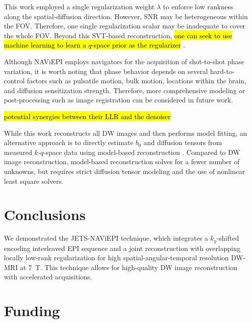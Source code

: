 \documentclass[preprint,12pt,authoryear,review]{elsarticle}
\begin{document}
    This work employed a single regularization weight $\lambda$
    to enforce low rankness along the spatial-diffusion direction.
    However, SNR may be heterogeneous within the FOV.
    Therefore, one single regularization scalar may be inadequate
    to cover the whole FOV.
    Beyond this SVT-based reconstruction,
    \hl{one can seek to use machine learning to
    learn a $q$-space prior as the regularizer}
    \citep{hammernik_2018_varnet,lam_2019_mrsi,mani_2021_qmodel}.

    Although NAViEPI employs navigators for
    the acquisition of shot-to-shot phase variation,
    it is worth noting that phase behavior depends on
    several hard-to-control factors
    such as pulsatile motion, bulk motion,
    locations within the brain, and
    diffusion sensitization strength.
    Therefore, more comprehensive modeling or post-processing
    such as image registration can be considered in future work.

    \hl{potential synergies between their LLR and the denoiser}

    While this work reconstructs all DW images and
    then performs model fitting,
    an alternative approach is to directly estimate
    $b_0$ and diffusion tensors
    from measured $k$-$q$-space data
    using model-based reconstruction
    \citep{knoll_2015_mobadiff,dong_2018_mobadiff,shafieizargar_2023_adept}.
    Compared to DW image reconstruction,
    model-based reconstruction solves for a fewer number of unknowns,
    but requires strict diffusion tensor modeling
    and the use of nonlinear least square solvers.

    \section{Conclusions}
    \label{SEC:Conc}

    We demonstrated the JETS-NAViEPI technique, which integrates
    a $k_y$-shifted encoding interleaved EPI sequence and
    a joint reconstruction with overlapping locally low-rank regularization
    for high spatial-angular-temporal resolution DW-MRI at \SI{7}{\tesla}.
    This technique allows for high-quality DW image reconstruction
    with accelerated acquisitions.

    \section*{Funding}
\end{document}
